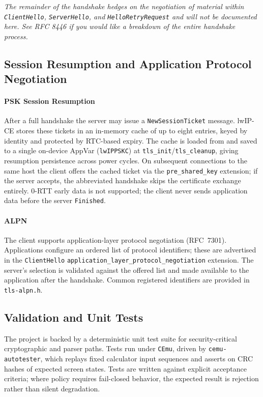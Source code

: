 \documentclass[titlepage]{report}
\begin{document}
	\textit{The remainder of the handshake hedges on the negotiation of material within \texttt{ClientHello}, \texttt{ServerHello}, and \texttt{HelloRetryRequest} and will not be documented here. See RFC 8446 if you would like a breakdown of the entire handshake process.}

	\subsection{Session Resumption and Application Protocol Negotiation}

	\paragraph{PSK Session Resumption}
	After a full handshake the server may issue a \texttt{NewSessionTicket} message. lwIP-CE stores these tickets in an in-memory cache of up to eight entries, keyed by identity and protected by RTC-based expiry. The cache is loaded from and saved to a single on-device AppVar (\texttt{lwIPPSKC}) at \texttt{tls\_init}/\texttt{tls\_cleanup}, giving resumption persistence across power cycles. On subsequent connections to the same host the client offers the cached ticket via the \texttt{pre\_shared\_key} extension; if the server accepts, the abbreviated handshake skips the certificate exchange entirely. 0-RTT early data is not supported; the client never sends application data before the server \texttt{Finished}.

	\paragraph{ALPN}
	The client supports application-layer protocol negotiation (RFC~7301). Applications configure an ordered list of protocol identifiers; these are advertised in the \texttt{ClientHello} \texttt{application\_layer\_protocol\_negotiation} extension. The server's selection is validated against the offered list and made available to the application after the handshake. Common registered identifiers are provided in \texttt{tls-alpn.h}.

	\subsection{Validation and Unit Tests}\label{ssec:profiling_unit_tests_ref}
		The project is backed by a deterministic unit test suite for security-critical cryptographic and parser paths. Tests run under \texttt{CEmu}, driven by \texttt{cemu-autotester}, which replays fixed calculator input sequences and asserts on CRC hashes of expected screen states. Tests are written against explicit acceptance criteria; where policy requires fail-closed behavior, the expected result is rejection rather than silent degradation.
\end{document}
